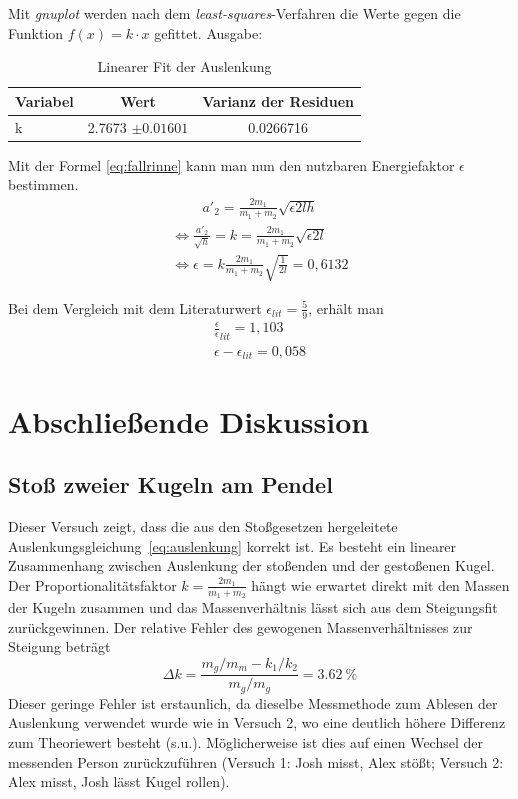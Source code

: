 Mit \emph{gnuplot} werden nach dem \emph{least-squares}-Verfahren die Werte gegen die Funktion $f(x)=k\cdot x$ gefittet. Ausgabe:

\begin{table}[H]
  \centering
  \begin{tabular}{l | c | c}
    Variabel & Wert & Varianz der Residuen \\ \hline
    k & \num{2.7673} $\pm0.01601$  & \num{0.0266716} 
  \end{tabular}
  \caption{Linearer Fit der Auslenkung}
  \label{tab:durchbiegungsfit}
\end{table}

Mit der Formel \ref{eq:fallrinne} kann man nun den nutzbaren Energiefaktor $\epsilon$ bestimmen.
\begin{gather}
a'_2=\frac{2m_1}{m_1+m_2}\sqrt{\epsilon 2lh}
\end{gather}\begin{gather*}
\iff \frac{a'_2}{\sqrt{h}}=k=\frac{2m_1}{m_1+m_2}\sqrt{\epsilon 2l}\\
\iff \epsilon = k \frac{2m_1}{m_1+m_2}\sqrt{\frac{1}{2l}}= 0,6132
\end{gather*}

Bei dem Vergleich mit dem Literaturwert $\epsilon_{lit}=\frac{5}{9}$, erhält man
\begin{gather}
\frac{\epsilon}\epsilon_{lit}=1,103\\
\epsilon - \epsilon_{lit}= 0,058
\end{gather}
\section{Abschließende Diskussion}
\subsection{Stoß zweier Kugeln am Pendel}
Dieser Versuch zeigt, dass die aus den Stoßgesetzen hergeleitete Auslenkungsgleichung~\cref{eq:auslenkung} korrekt ist. Es besteht ein linearer Zusammenhang zwischen Auslenkung der stoßenden und der gestoßenen Kugel. Der Proportionalitätsfaktor $k=\frac{2m_1}{m_1+m_2}$ hängt wie erwartet direkt mit den Massen der Kugeln zusammen und das Massenverhältnis lässt sich aus dem Steigungsfit zurückgewinnen.
Der relative Fehler des gewogenen Massenverhältnisses zur Steigung beträgt
\begin{equation}
  \Delta k = \frac{m_g/m_m-k_1/k_2}{m_g/m_g}=\SI{3.62}{\percent}
  \label{eq:steigungsfehler_rel}
\end{equation}
Dieser geringe Fehler ist erstaunlich, da dieselbe Messmethode zum Ablesen der Auslenkung verwendet wurde wie in Versuch 2, wo eine deutlich höhere Differenz zum Theoriewert besteht (s.u.). Möglicherweise ist dies auf einen Wechsel der messenden Person zurückzuführen (Versuch 1: Josh misst, Alex stößt; Versuch 2: Alex misst, Josh lässt Kugel rollen).
